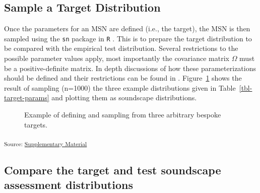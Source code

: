 \documentclass[
  authoryear,
  preprint,
  1p]{elsarticle}
\begin{document}
\subsection{Sample a Target
Distribution}\label{sec-sample-a-target-distribution}

Once the parameters for an MSN are defined (i.e., the target), the MSN
is then sampled using the \texttt{sn} package \citep{Azzalini2021R} in
\texttt{R} \citep{RCT2018R}. This is to prepare the target distribution
to be compared with the empirical test distribution. Several
restrictions to the possible parameter values apply, most importantly
the covariance matrix \(\Omega\) must be a positive-definite matrix. In
depth discussions of how these parameterizations should be defined and
their restrictions can be found in \citet{Azzalini2016How}.
Figure~\ref{fig-targets} shows the result of sampling (n=1000) the three
example distributions given in Table~\ref{tbl-target-params} and
plotting them as soundscape distributions.

\begin{figure}[H]


\caption{\label{fig-targets}Example of defining and sampling from three
arbitrary bespoke targets.}

\end{figure}%

\textsubscript{Source:
\href{https://MitchellAcoustics.github.io/J2401_JASA_SSID-Single-Index/notebooks/SingleIndex-Code-preview.html\#cell-fig-targets}{Supplementary
Material }}

\subsection{Compare the target and test soundscape assessment
distributions}\label{compare-the-target-and-test-soundscape-assessment-distributions}
\end{document}
